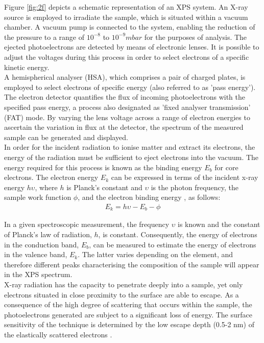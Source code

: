 \noindent Figure \ref{fig:2f} depicts a schematic representation of an XPS system. An X-ray source is employed to irradiate the sample, which is situated within a vacuum chamber. A vacuum pump is connected to the system, enabling the reduction of the pressure to a range of $10^{-8}$ to $10^{-9} mbar$ for the purposes of analysis. The ejected photoelectrons are detected by means of electronic lenses. It is possible to adjust the voltages during this process in order to select electrons of a specific kinetic energy. \\

\noindent A hemispherical analyser (HSA), which comprises a pair of charged plates, is employed to select electrons of specific energy (also referred to as 'pass energy'). The electron detector quantifies the flux of incoming photoelectrons with the specified pass energy, a process also designated as 'fixed analyser transmission' (FAT) mode. By varying the lens voltage across a range of electron energies to ascertain the variation in flux at the detector, the spectrum of the measured sample can be generated and displayed.\\


\noindent In order for the incident radiation to ionise matter and extract its electrons, the energy of the radiation must be sufficient to eject electrons into the vacuum. The energy required for this process is known as the binding energy $E_{b}$ for core electrons. The electron energy $E_k$ can be expressed in terms of the incident x-ray energy $h\upsilon$, where $h$ is Planck's constant and $\upsilon$ is the photon frequency, the sample work function $\phi$, and the electron binding energy , as follows:
\begin{align}
E_k = h\upsilon - E_{b} - \phi \label{eq:2.20}
\end{align}

\noindent In a given spectroscopic measurement, the frequency $\upsilon$ is known and the constant of Planck's law of radiation, $h$, is constant. Consequently, the energy of electrons in the conduction band, $E_b$, can be measured to estimate the energy of electrons in the valence band, $E_k$. The latter varies depending on the element, and therefore different peaks characterising the composition of the sample will appear in the XPS spectrum.\\

\noindent X-ray radiation has the capacity to penetrate deeply into a sample, yet only electrons situated in close proximity to the surface are able to escape. As a consequence of the high degree of scattering that occurs within the sample, the photoelectrons generated are subject to a significant loss of energy. The surface sensitivity of the technique is determined by the low escape depth (0.5-2 nm) of the elastically scattered electrons \cite{oswald2006x}.\\

